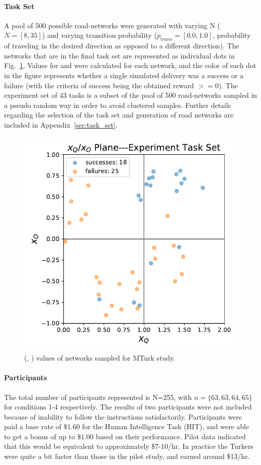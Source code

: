     \noindent \paragraph{Task Set}
    A pool of 500 possible road-networks were generated with varying N ($N=[8,35]$) and varying transition probability ($p_{trans}=[0.0,1.0]$, probability of traveling in the desired direction as opposed to a different direction). The networks that are in the final task set are represented as individual dots in Fig.~\ref{fig:exp_set}. Values for \xQ{} and \xO{} were calculated for each network, and the color of each dot in the figure represents whether a single simulated delivery was a success or a failure (with the criteria of success being the obtained reward $ >= 0$). The experiment set of 43 tasks is a subset of the pool of 500 road-networks sampled in a pseudo random way in order to avoid clustered samples. Further details regarding the selection of the task set and generation of road networks are included in Appendix~\ref{sec:task_set}.

    \begin{figure}[tbp]
        \centering
        \includegraphics[width=0.6\linewidth]{Figures/xQxO_plane_experiment_set.pdf}
        \caption{(\xQ{}, \xO{}) values of networks sampled for MTurk study.}
        \label{fig:exp_set}
    \end{figure}

    \noindent \paragraph{Participants}
    The total number of participants represented is N=255, with $n=\{63,63,64,65\}$ for conditions 1-4 respectively. The results of two participants were not included because of inability to follow the instructions satisfactorily. Participants were paid a base rate of $\$1.60$ for the Human Intelligence Task (HIT), and were able to get a bonus of up to $\$1.00$ based on their performance. Pilot data indicated that this would be equivalent to approximately \$7-10/hr. In practice the Turkers were quite a bit faster than those in the pilot study, and earned around \$13/hr.
